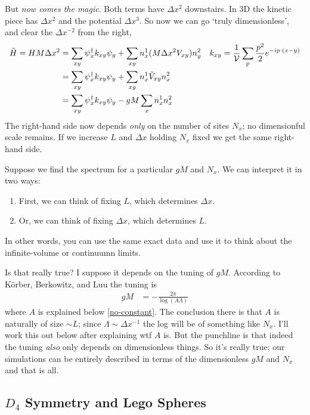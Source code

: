 But \emph{now comes the magic}.
Both terms have $\Delta x^2$ downstairs.
In 3D the kinetic piece has $\Delta x^2$ and the potential $\Delta x^3$.
So now we can go `truly dimensionless', and clear the $\Delta x^{-2}$ from the right,
\begin{align}
	\tilde{H} = HM \Delta x^2
	&=
    \sum_{xy} \psi{}^{\dagger}_x k_{xy} \psi_y + \sum_{xy} n^1_x (M \Delta x^2 V_{xy}) n^2_y
	&
    k_{xy} &= \frac{1}{\mathcal{V}} \sum_{p} \frac{p^2}{2} e^{-i p \cdot (x-y)}
    \nonumber\\
    &= \sum_{xy} \psi{}^{\dagger}_x k_{xy} \psi_y + \sum_{xy} n^1_x \tilde{V}_{xy} n^2_x
    \nonumber\\
    &= \sum_{xy} \psi{}^{\dagger}_x k_{xy} \psi_y - gM \sum_x n^1_x n^2_x
	\label{eq:hamiltonian}
\end{align}
The right-hand side now depends \emph{only} on the number of sites $N_x$; no dimensionful scale remains.
If we increase $L$ and $\Delta x$ holding $N_x$ fixed we get the same right-hand side.

Suppose we find the spectrum for a particular $gM$ and $N_x$.
We can interpret it in two ways:
\begin{enumerate}
	\item First, we can think of fixing $L$, which determines $\Delta x$.
	\item Or, we can think of fixing $\Delta x$, which determines $L$.
\end{enumerate}
In other words, you can use the same exact data and use it to think about the infinite-volume or continuumn limits.

Is that really true?  I suppose it depends on the tuning of $gM$.
According to K\"{o}rber, Berkowitz, and Luu the tuning is
\begin{align}
	gM &= - \frac{2\pi}{\log(A \Lambda)}
	\label{eq:tuning}
\end{align}
where $A$ is explained below \eqref{no-constant}.
The conclusion there is that $A$ is naturally of size $\sim L$; since $\Lambda\sim \Delta x^{-1}$ the log will be of something like $N_x$.
I'll work this out below after explaining wtf $A$ is.
But the punchline is that indeed the tuning \emph{also} only depends on dimensionless things.
So it's really true; our simulations can be entirely described in terms of the dimensionless $gM$ and $N_x$ and that is all.

\subsection{$D_4$ Symmetry and Lego Spheres}


